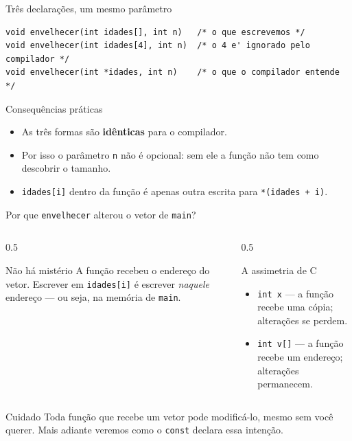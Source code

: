\documentclass[aspectratio=169]{beamer}
\begin{document}
\begin{frame}[fragile]{Três declarações, um mesmo parâmetro}
\begin{lstlisting}[numbers=none]
void envelhecer(int idades[], int n)   /* o que escrevemos */
void envelhecer(int idades[4], int n)  /* o 4 e' ignorado pelo compilador */
void envelhecer(int *idades, int n)    /* o que o compilador entende */
\end{lstlisting}
  \begin{block}{Consequências práticas}
    \begin{itemize}
      \item As três formas são \textbf{idênticas} para o compilador.
      \item Por isso o parâmetro \texttt{n} não é opcional: sem ele a função
            não tem como descobrir o tamanho.
      \item \texttt{idades[i]} dentro da função é apenas outra escrita para
            \texttt{*(idades + i)}.
    \end{itemize}
  \end{block}
\end{frame}

\begin{frame}{Por que \texttt{envelhecer} alterou o vetor de \texttt{main}?}
  \begin{columns}[T]
    \begin{column}{0.5\textwidth}
      \begin{block}{Não há mistério}
        A função recebeu o endereço do vetor. Escrever em \texttt{idades[i]} é
        escrever \emph{naquele} endereço --- ou seja, na memória de
        \texttt{main}.
      \end{block}
    \end{column}
    \begin{column}{0.5\textwidth}
      \begin{exampleblock}{A assimetria de C}
        \begin{itemize}
          \item \texttt{int x} --- a função recebe uma cópia; alterações se perdem.
          \item \texttt{int v[]} --- a função recebe um endereço; alterações
                permanecem.
        \end{itemize}
      \end{exampleblock}
    \end{column}
  \end{columns}
  \begin{alertblock}{Cuidado}
    Toda função que recebe um vetor pode modificá-lo, mesmo sem você querer.
    Mais adiante veremos como o \texttt{const} declara essa intenção.
  \end{alertblock}
\end{frame}
\end{document}
